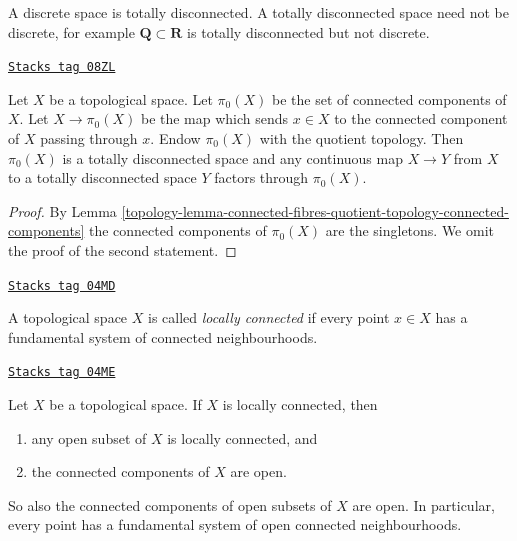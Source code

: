 A discrete space is totally disconnected.
A totally disconnected space need not be discrete, for example
$\mathbf{Q} \subset \mathbf{R}$ is totally disconnected but not discrete.

\begin{lemma}
\label{topology-lemma-space-connected-components}
\href{https://stacks.math.columbia.edu/tag/08ZL}{\texttt{Stacks tag 08ZL}}

Let $X$ be a topological space. Let $\pi_0(X)$ be the set of connected
components of $X$. Let $X \to \pi_0(X)$ be the map which sends
$x \in X$ to the connected component of $X$ passing through $x$.
Endow $\pi_0(X)$ with the quotient topology. Then $\pi_0(X)$ is a
totally disconnected space and any continuous map $X \to Y$
from $X$ to a totally disconnected space $Y$ factors through $\pi_0(X)$.
\end{lemma}

\begin{proof}

By Lemma
\ref{topology-lemma-connected-fibres-quotient-topology-connected-components}
the connected components of $\pi_0(X)$ are the singletons.
We omit the proof of the second statement.
\end{proof}

\begin{definition}
\label{topology-definition-locally-connected}
\href{https://stacks.math.columbia.edu/tag/04MD}{\texttt{Stacks tag 04MD}}

A topological space $X$ is called {\it locally connected} if
every point $x \in X$ has a fundamental system of connected neighbourhoods.
\end{definition}

\begin{lemma}
\label{topology-lemma-locally-connected}
\href{https://stacks.math.columbia.edu/tag/04ME}{\texttt{Stacks tag 04ME}}

Let $X$ be a topological space. If $X$ is locally connected, then
\begin{enumerate}
\item any open subset of $X$ is locally connected, and
\item the connected components of $X$ are open.
\end{enumerate}
So also the connected components of open subsets of $X$ are open.
In particular, every point has a fundamental system of open connected
neighbourhoods.
\end{lemma}

